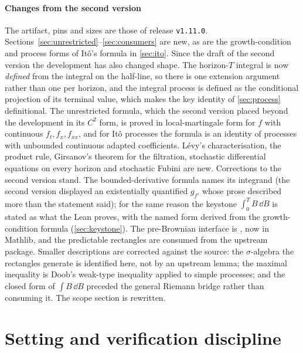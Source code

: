\documentclass[11pt]{article}
\begin{document}
\paragraph{Changes from the second version}
The artifact, pins and sizes are those of release \texttt{v1.11.0}. Sections~\ref{sec:unrestricted}--\ref{sec:consumers}
are new, as are the growth-condition and process forms of It\^o's formula in \cref{sec:ito}. Since the draft of
the second version the development has also changed shape. The horizon-$T$ integral is now \emph{defined} from the
integral on the half-line, so there is one extension argument rather than one per horizon, and the integral process
is defined as the conditional projection of its terminal value, which makes the key identity of \cref{sec:process}
definitional. The unrestricted formula, which the second version placed beyond the development in its $C^2$ form,
is proved in local-martingale form for $f$ with continuous $f_t,f_x,f_{xx}$, and for It\^o processes the formula is
an identity of processes with unbounded continuous adapted coefficients. L\'evy's characterisation, the product rule,
Girsanov's theorem for the filtration, stochastic differential equations on every horizon and stochastic Fubini are
new. Corrections to the second version stand. The bounded-derivative formula names its integrand (the second
version displayed an existentially quantified $g_{f'}$ whose prose described more than the statement said); for the
same reason the keystone $\int_0^TB\,\dd B$ is stated as what the Lean proves, with the named form derived from the
growth-condition formula (\cref{sec:keystone}). The pre-Brownian interface is , now in
Mathlib, and the predictable rectangles are consumed from the upstream package. Smaller descriptions are corrected
against the source: the $\sigma$-algebra the rectangles generate is identified here, not by an upstream lemma; the
maximal inequality is Doob's weak-type inequality applied to simple processes; and the closed form of
$\int B\,\dd B$ preceded the general Riemann bridge rather than consuming it. The scope section is rewritten.

\section{Setting and verification discipline}\label{sec:setting}
\end{document}
